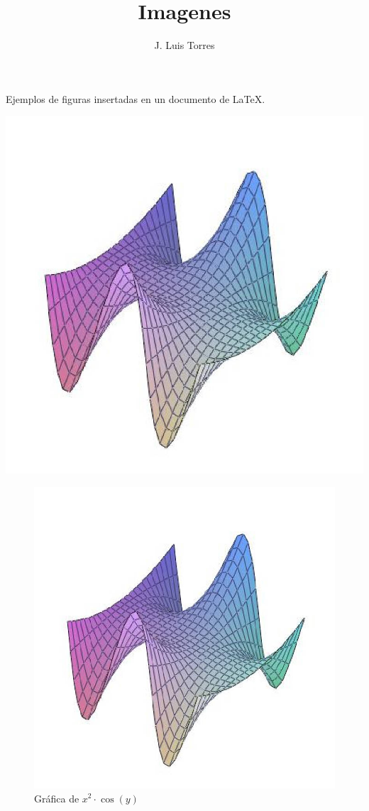 \documentclass[letterpaper,12pt]{article}
\title{Imagenes}
\author{J. Luis Torres}
\begin{document}
\maketitle

Ejemplos de figuras insertadas en un documento de \LaTeX{}.

\includegraphics{grafica10.jpg}

\newpage

\begin{figure}[h!]
\centering
\includegraphics[scale=0.5]{grafica10.jpg}
\caption{Gráfica de $x^2 \cdot \cos (y)$}
\end{figure}
\end{document}
